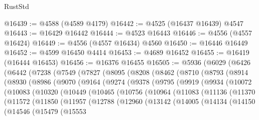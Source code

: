 \begin{lexlean}{RustStd}
\begin{coremodule}
@16439 := @4588 (@4589 @4179)
@16442 := @4525 (@16437 @16439) @4547
@16443 := @16429 @16442
@16444 := @4523 @16443
@16446 := @4556 (@4557 @16424)
@16449 := @4556 (@4557 @16434) @4560
@16450 := @16446 @16449
@16452 := @4599 @16450 @4414
@16453 := @4689 @16452
@16455 := @16419 (@16444 @16453)
@16456 := @16376 @16455
@16505 := @5936
    (@6029
      (@6426
        (@6442
          (@7238
            (@7549
              (@7827
                (@8095
                  (@8208
                    (@8462
                      (@8710
                        (@8793
                          (@8914
                            (@8930
                              (@8986
                                (@9070
                                  (@9164
                                    (@9274
                                      (@9378
                                        (@9795
                                          (@9919
                                            (@9934
                                              (@10072
                                                (@10083
                                                  (@10320
                                                    (@10449
                                                      (@10465
                                                        (@10756
                                                          (@10964
                                                            (@11083
                                                              (@11136
                                                                (@11370
                                                                  (@11572
                                                                    (@11850
                                                                      (@11957
                                                                        (@12788
                                                                          (@12960
                                                                            (@13142
                                                                              (@14005
                                                                                (@14134
                                                                                  (@14150
                                                                                    (@14546
                                                                                      (@15479
                                                                                        (@15553

\end{coremodule}
\end{lexlean}
